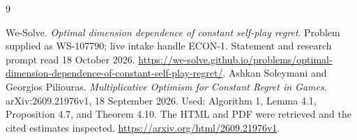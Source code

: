 \documentclass[11pt]{article}
\begin{document}
\begin{thebibliography}{9}
\raggedright
{}
We-Solve. \emph{Optimal dimension dependence of constant self-play regret}.
Problem supplied as WS-107790; live intake handle ECON-1. Statement and
research prompt read 18 October 2026.
\url{https://we-solve.github.io/problems/optimal-dimension-dependence-of-constant-self-play-regret/}.
Ashkan Soleymani and Georgios Piliouras.
\emph{Multiplicative Optimism for Constant Regret in Games}.
arXiv:2609.21976v1, 18 September 2026. Used: Algorithm 1,
Lemma 4.1, Proposition 4.7, and Theorem 4.10. The HTML and PDF were
retrieved and the cited estimates inspected.
\url{https://arxiv.org/html/2609.21976v1}.
\end{thebibliography}
\end{document}
